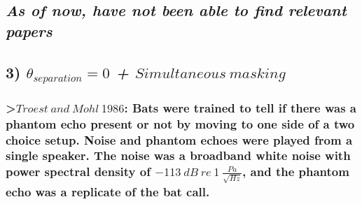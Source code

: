\documentclass[11pt]{article}
\begin{document}
\hypertarget{as-of-now-have-not-been-able-to-find-relevant-papers}{%
\subsection{\texorpdfstring{\emph{As of now, have not been able to find
relevant
papers}}{As of now, have not been able to find relevant papers}}\label{as-of-now-have-not-been-able-to-find-relevant-papers}}

    \hypertarget{theta_separation-0-simultaneous-masking}{%
\subsection{\texorpdfstring{3) \emph{\(\theta_{separation} = 0\) +
\(Simultaneous\ masking\)}}{3) \textbackslash{}theta\_\{separation\} = 0 + Simultaneous\textbackslash{} masking}}\label{theta_separation-0-simultaneous-masking}}

\hypertarget{troest-and-mohl-1986-bats-were-trained-to-tell-if-there-was-a-phantom-echo-present-or-not-by-moving-to-one-side-of-a-two-choice-setup.-noise-and-phantom-echoes-were-played-from-a-single-speaker.-the-noise-was-a-broadband-white-noise-with-power-spectral-density-of--113-db-re-1-fracpasqrthz-and-the-phantom-echo-was-a-replicate-of-the-bat-call.}{%
\subsubsection{\texorpdfstring{\textgreater{}\href{https://link.springer.com/article/10.1007\%2FBF00604175?LI=true}{\(Troest\ and\ Mohl\ 1986\)}:
Bats were trained to tell if there was a phantom echo present or not by
moving to one side of a two choice setup. Noise and phantom echoes were
played from a single speaker. The noise was a broadband white noise with
power spectral density of \(-113\ dB\ re\ 1\ \frac{Pa}{\sqrt{Hz}}\), and
the phantom echo was a replicate of the bat
call.}{\textgreater{}Troest\textbackslash{} and\textbackslash{} Mohl\textbackslash{} 1986: Bats were trained to tell if there was a phantom echo present or not by moving to one side of a two choice setup. Noise and phantom echoes were played from a single speaker. The noise was a broadband white noise with power spectral density of -113\textbackslash{} dB\textbackslash{} re\textbackslash{} 1\textbackslash{} \textbackslash{}frac\{Pa\}\{\textbackslash{}sqrt\{Hz\}\}, and the phantom echo was a replicate of the bat call.}}\label{troest-and-mohl-1986-bats-were-trained-to-tell-if-there-was-a-phantom-echo-present-or-not-by-moving-to-one-side-of-a-two-choice-setup.-noise-and-phantom-echoes-were-played-from-a-single-speaker.-the-noise-was-a-broadband-white-noise-with-power-spectral-density-of--113-db-re-1-fracpasqrthz-and-the-phantom-echo-was-a-replicate-of-the-bat-call.}}
\end{document}
